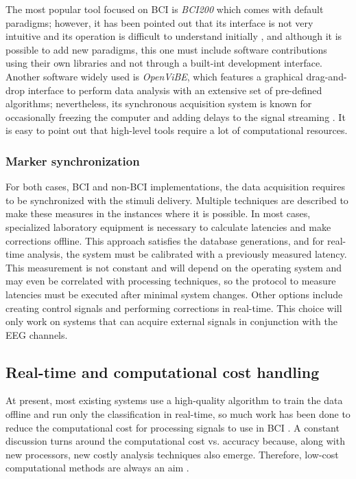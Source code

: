 The most popular tool focused on \gls*{BCI} is \textit{BCI200} which comes with default paradigms; however, it has been pointed out that its interface is not very intuitive and its operation is difficult to understand initially  \cite{madrid2014brain}, and although it is possible to add new paradigms, this one must include software contributions using their own libraries and not through a built-int development interface. Another software widely used is \textit{OpenViBE}, which features a graphical drag-and-drop interface to perform data analysis with an extensive set of pre-defined algorithms; nevertheless, its synchronous acquisition system is known for occasionally freezing the computer and adding delays to the signal streaming \cite{peterson2020feasibility}. It is easy to point out that high-level tools require a lot of computational resources.

\subsubsection{Marker synchronization}

For both cases, \gls*{BCI} and non-\gls*{BCI} implementations, the data acquisition requires to be synchronized with the stimuli delivery. Multiple techniques are described \cite{wilson2010procedure} to make these measures in the instances where it is possible. In most cases, specialized laboratory equipment is necessary \cite{appelhoff2021we, razavi2022opensync} to calculate latencies and make corrections offline. This approach satisfies the database generations, and for real-time analysis, the system must be calibrated with a previously measured latency. This measurement is not constant and will depend on the operating system and may even be correlated with processing techniques, so the protocol to measure latencies must be executed after minimal system changes. Other options include creating control signals \cite{davis2020stimulus} and performing corrections in real-time. This choice will only work on systems that can acquire external signals in conjunction with the \gls*{EEG} channels.

\subsection{Real-time and computational cost handling}

At present, most existing systems use a high-quality algorithm to train the data offline and run only the classification in real-time, so much work has been done to reduce the computational cost for processing signals to use in \gls*{BCI} \cite{netzer2020real, hasan2020computationally}. A constant discussion turns around the computational cost vs. accuracy \cite{ahmadi2012brain} because, along with new processors, new costly analysis techniques also emerge. Therefore, low-cost computational methods are always an aim \cite{changoluisa2020low}.

